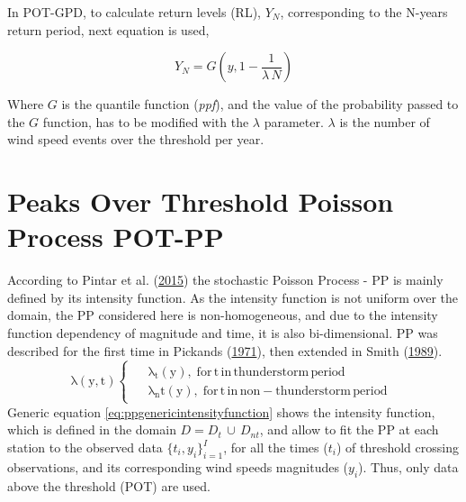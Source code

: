 \documentclass[12pt,oneside]{reedthesis}
\begin{document}
In POT-GPD, to calculate return levels (RL), \(Y_N\), corresponding to the N-years return period, next equation is used,

\[
Y_N =G\left(y, 1-\frac{1}{\lambda\,N}\right)
\]

Where \(G\) is the quantile function (\emph{ppf}), and the value of the probability passed to the \(G\) function, has to be modified with the \(\lambda\) parameter. \(\lambda\) is the number of wind speed events over the threshold per year.

\hypertarget{pot-pp}{%
\section{Peaks Over Threshold Poisson Process POT-PP}\label{pot-pp}}

According to Pintar et al. (\protect\hyperlink{ref-Pintar2015}{2015}) the stochastic Poisson Process - PP is mainly defined by its intensity function. As the intensity function is not uniform over the domain, the PP considered here is non-homogeneous, and due to the intensity function dependency of magnitude and time, it is also bi-dimensional. PP was described for the first time in Pickands (\protect\hyperlink{ref-Pickands1971}{1971}), then extended in Smith (\protect\hyperlink{ref-Smith1989}{1989}).
\begin{equation}
  \mathrm{
    \lambda\left(y,t\right)
    \begin{cases}
      \begin{split}
            &\lambda_t(y),\;for\,t\,in\,thunderstorm\,period
            \\
            &\lambda_nt(y),\;for\,t\,in\,non-thunderstorm\,period      
      \end{split}
    \end{cases}
  }
  \label{eq:ppgenericintensityfunction}
\end{equation}
Generic equation \eqref{eq:ppgenericintensityfunction} shows the intensity function, which is defined in the domain \(D = D_t\,{\cup}\,D_{nt}\), and allow to fit the PP at each station to the observed data \(\{t_i, y_i\}_{i=1}^I\), for all the times (\(t_i\)) of threshold crossing observations, and its corresponding wind speeds magnitudes (\(y_i\)). Thus, only data above the threshold (POT) are used.
\end{document}
